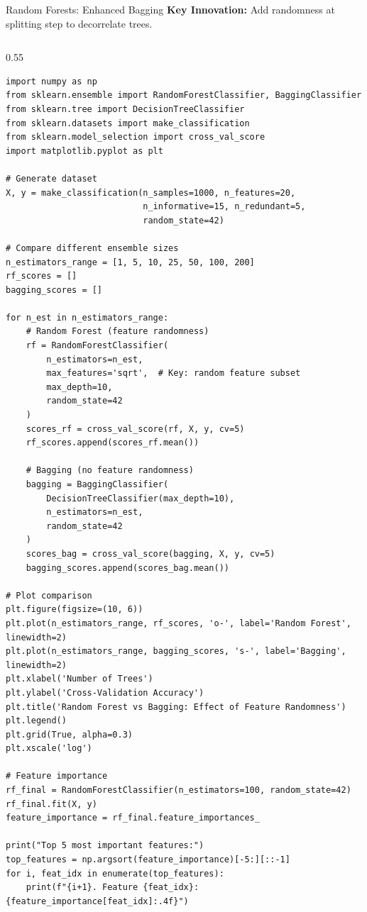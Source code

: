 \begin{frame}[fragile]{Random Forests: Enhanced Bagging}
\textbf{Key Innovation:} Add randomness at splitting step to decorrelate trees.

\begin{columns}
\begin{column}{0.55\textwidth}
\begin{lstlisting}[basicstyle=\ttfamily\tiny]
import numpy as np
from sklearn.ensemble import RandomForestClassifier, BaggingClassifier
from sklearn.tree import DecisionTreeClassifier
from sklearn.datasets import make_classification
from sklearn.model_selection import cross_val_score
import matplotlib.pyplot as plt

# Generate dataset
X, y = make_classification(n_samples=1000, n_features=20,
                           n_informative=15, n_redundant=5,
                           random_state=42)

# Compare different ensemble sizes
n_estimators_range = [1, 5, 10, 25, 50, 100, 200]
rf_scores = []
bagging_scores = []

for n_est in n_estimators_range:
    # Random Forest (feature randomness)
    rf = RandomForestClassifier(
        n_estimators=n_est,
        max_features='sqrt',  # Key: random feature subset
        max_depth=10,
        random_state=42
    )
    scores_rf = cross_val_score(rf, X, y, cv=5)
    rf_scores.append(scores_rf.mean())

    # Bagging (no feature randomness)
    bagging = BaggingClassifier(
        DecisionTreeClassifier(max_depth=10),
        n_estimators=n_est,
        random_state=42
    )
    scores_bag = cross_val_score(bagging, X, y, cv=5)
    bagging_scores.append(scores_bag.mean())

# Plot comparison
plt.figure(figsize=(10, 6))
plt.plot(n_estimators_range, rf_scores, 'o-', label='Random Forest', linewidth=2)
plt.plot(n_estimators_range, bagging_scores, 's-', label='Bagging', linewidth=2)
plt.xlabel('Number of Trees')
plt.ylabel('Cross-Validation Accuracy')
plt.title('Random Forest vs Bagging: Effect of Feature Randomness')
plt.legend()
plt.grid(True, alpha=0.3)
plt.xscale('log')

# Feature importance
rf_final = RandomForestClassifier(n_estimators=100, random_state=42)
rf_final.fit(X, y)
feature_importance = rf_final.feature_importances_

print("Top 5 most important features:")
top_features = np.argsort(feature_importance)[-5:][::-1]
for i, feat_idx in enumerate(top_features):
    print(f"{i+1}. Feature {feat_idx}: {feature_importance[feat_idx]:.4f}")


\end{lstlisting}
\end{column}
\end{columns}
\end{frame}
